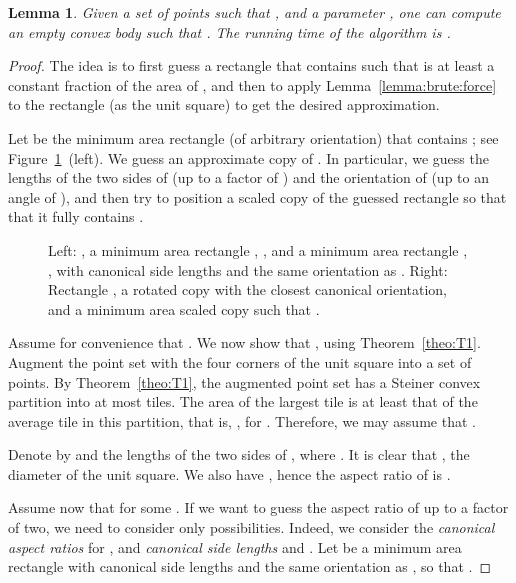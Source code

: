 \documentclass[11pt]{article}
\newtheorem{lemma}{Lemma}
\newcommand{\lemlab}[1]{\label{lemma:#1}}
\newcommand{\lemref}[1]{Lemma~\ref{lemma:#1}}
\newcommand{\thmref}[1]{Theorem~\ref{theo:#1}}
\newcommand{\figlab}[1]{\label{fig:#1}}
\newcommand{\figref}[1]{Figure~\ref{fig:#1}}
\begin{document}
\begin{lemma}\lemlab{algorithm:2d}Given a set  of  points such that
    , and a parameter ,
    one can compute an empty convex body  such that
    .
   The running time of the algorithm is
.
\end{lemma}
\begin{proof}
   The idea is to first guess a rectangle  that contains
    such that  is at least a constant
   fraction of the area of , and then to apply
   \lemref{brute:force} to the rectangle  (as the unit square) to
   get the desired approximation.

   Let  be the minimum area rectangle (of arbitrary orientation)
   that contains ; see \figref{boundingbox}~(left). We guess an
   approximate copy of . In particular, we guess the lengths of
   the two sides of  (up to a factor of ) and the orientation of
    (up to an angle of ), and then try to position a
   scaled copy of the guessed rectangle so that that it fully contains .

\begin{figure} [htb]
\centerline{\epsfxsize=4.9in }
    \caption{Left: , a minimum area rectangle ,
      ,
    and a minimum area rectangle , , with
    canonical side lengths and the same orientation as .
    Right: Rectangle , a rotated copy  with the closest canonical
    orientation, and a minimum area scaled copy  such that
    .}
    \figlab{boundingbox}
\end{figure}

    Assume for convenience that .
    We now show that , using \thmref{T1}.
    Augment the point set  with the four corners of the unit square 
    into a set of  points. By \thmref{T1}, the augmented point set has a Steiner
    convex partition into at most  tiles.
    The area of the largest tile is at least that of the average tile
    in this partition, that is,
    , for .
    Therefore, we may assume that .

    Denote by  and  the lengths of the two sides of , where .
    It is clear that , the diameter of the unit square.
    We also have , hence the aspect ratio of  is .

    Assume now that 
    for some .
    If we want to guess the aspect ratio of  up to a factor of two,
    we need to consider only  possibilities.
    Indeed, we consider the \emph{canonical aspect ratios}  for
    ,
    and \emph{canonical side lengths}  and
    .
    Let  be a minimum area rectangle with canonical side lengths
    and the same orientation as , so that .


\end{proof}
\end{document}
